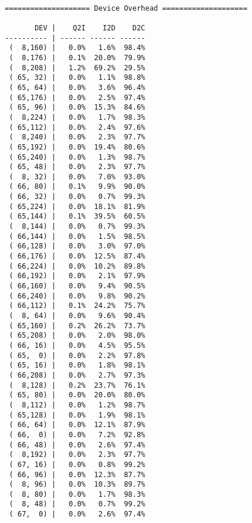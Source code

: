 \documentclass{article}
\begin{document}
\newpage\begin{verbatim}

==================== Device Overhead ====================

       DEV |    Q2I    I2D    D2C
---------- | ------ ------ ------
 (  8,160) |   0.0%   1.6%  98.4%
 (  8,176) |   0.1%  20.0%  79.9%
 (  8,208) |   1.2%  69.2%  29.5%
 ( 65, 32) |   0.0%   1.1%  98.8%
 ( 65, 64) |   0.0%   3.6%  96.4%
 ( 65,176) |   0.0%   2.5%  97.4%
 ( 65, 96) |   0.0%  15.3%  84.6%
 (  8,224) |   0.0%   1.7%  98.3%
 ( 65,112) |   0.0%   2.4%  97.6%
 (  8,240) |   0.0%   2.3%  97.7%
 ( 65,192) |   0.0%  19.4%  80.6%
 ( 65,240) |   0.0%   1.3%  98.7%
 ( 65, 48) |   0.0%   2.3%  97.7%
 (  8, 32) |   0.0%   7.0%  93.0%
 ( 66, 80) |   0.1%   9.9%  90.0%
 ( 66, 32) |   0.0%   0.7%  99.3%
 ( 65,224) |   0.0%  18.1%  81.9%
 ( 65,144) |   0.1%  39.5%  60.5%
 (  8,144) |   0.0%   0.7%  99.3%
 ( 66,144) |   0.0%   1.5%  98.5%
 ( 66,128) |   0.0%   3.0%  97.0%
 ( 66,176) |   0.0%  12.5%  87.4%
 ( 66,224) |   0.0%  10.2%  89.8%
 ( 66,192) |   0.0%   2.1%  97.9%
 ( 66,160) |   0.0%   9.4%  90.5%
 ( 66,240) |   0.0%   9.8%  90.2%
 ( 66,112) |   0.1%  24.2%  75.7%
 (  8, 64) |   0.0%   9.6%  90.4%
 ( 65,160) |   0.2%  26.2%  73.7%
 ( 65,208) |   0.0%   2.0%  98.0%
 ( 66, 16) |   0.0%   4.5%  95.5%
 ( 65,  0) |   0.0%   2.2%  97.8%
 ( 65, 16) |   0.0%   1.8%  98.1%
 ( 66,208) |   0.0%   2.7%  97.3%
 (  8,128) |   0.2%  23.7%  76.1%
 ( 65, 80) |   0.0%  20.0%  80.0%
 (  8,112) |   0.0%   1.2%  98.7%
 ( 65,128) |   0.0%   1.9%  98.1%
 ( 66, 64) |   0.0%  12.1%  87.9%
 ( 66,  0) |   0.0%   7.2%  92.8%
 ( 66, 48) |   0.0%   2.6%  97.4%
 (  8,192) |   0.0%   2.3%  97.7%
 ( 67, 16) |   0.0%   0.8%  99.2%
 ( 66, 96) |   0.0%  12.3%  87.7%
 (  8, 96) |   0.0%  10.3%  89.7%
 (  8, 80) |   0.0%   1.7%  98.3%
 (  8, 48) |   0.0%   0.7%  99.2%
 ( 67,  0) |   0.0%   2.6%  97.4%

\end{verbatim}
\end{document}
